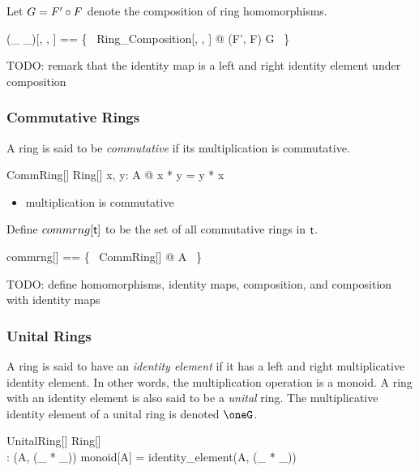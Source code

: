 \documentclass{amsart}
\begin{document}
Let $G = F' \mathbin{\circ} F$ denote the composition of ring homomorphisms.

\begin{zed}
	(\_ \circRng \_)[\genT, \genU, \genV] == \{~ Ring\_Composition[\genT, \genU, \genV] @ (F', F) \mapsto G ~\}
\end{zed}

TODO: remark that the identity map is a left and right identity element under composition

\subsubsection{Commutative Rings}

A ring is said to be \textit{commutative} if its multiplication is commutative.

\begin{schema}{CommRing}[\genT]
	Ring[\genT]
\where
	\forall x, y: A @ x * y = y * x
\end{schema}

\begin{itemize}
	\item multiplication is commutative
\end{itemize}

Define $commrng[\mathsf{t}]$ to be the set of all commutative rings in $\mathsf{t}$.

\begin{zed}
	commrng[\genT] == \{~ CommRing[\genT] @ A ~\}
\end{zed}

TODO: define homomorphisms, identity maps, composition, and composition with identity maps

\subsubsection{Unital Rings}

A ring is said to have an \textit{identity element} if it has a left and right multiplicative identity element.
In other words, the multiplication operation is a monoid.
A ring with an identity element is also said to be a \textit{unital} ring.
The multiplicative identity element of a unital ring is denoted $\oneG$.

\begin{schema}{UnitalRing}[\genT]
	Ring[\genT]\\
	\oneG: \genT
\where
	(A, (\_ * \_)) \in monoid[A]
\also
	\oneG = identity\_element(A, (\_ * \_))
\end{schema}
\end{document}
